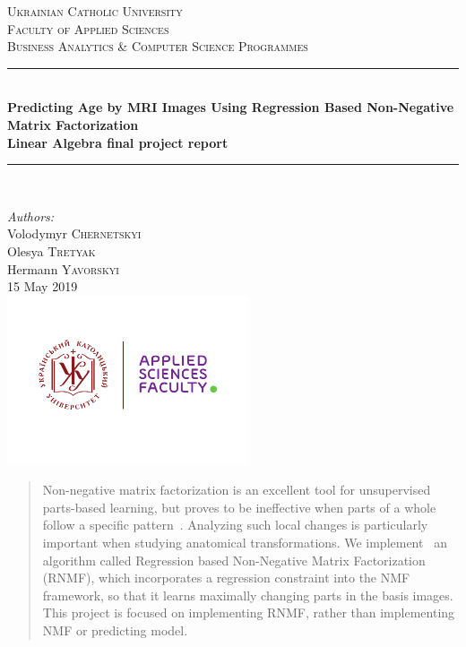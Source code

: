 \documentclass[12pt]{article}
\begin{document}
\begin{titlepage}

\newcommand{\HRule}{\rule{\linewidth}{0.5mm}} 

\center
 
\textsc{\LARGE Ukrainian Catholic University}\\[1cm]
\textsc{\Large  Faculty of Applied Sciences}\\[0.5cm]
\textsc{\large Business Analytics \& Computer Science Programmes}\\[0.5cm]

\vspace*{1cm}

\HRule \\[0.4cm]
{ \huge \bfseries  Predicting Age by MRI Images Using Regression Based Non-Negative Matrix Factorization }\\[10pt]
{\Large \bfseries Linear Algebra final project report}\\[0.4cm]
\HRule \\[1cm]

\vspace*{1cm}

\Large \emph{Authors:}\\
Volodymyr \textsc{Chernetskyi}\\Olesya \textsc{Tretyak}\\Hermann \textsc{Yavorskyi}\\[1cm]

\vspace*{1cm}
{\large 15 May 2019}\\[2cm]

\includegraphics[height=5cm]{UCU-Apps.png}\\[1cm]

\vfill

\end{titlepage}

\begin{abstract}

	Non-negative matrix factorization is an excellent tool for unsupervised parts-based learning, but proves to be ineffective when parts of a whole follow a specific pattern~\cite{Joshi}. Analyzing such local changes is particularly important when studying anatomical transformations. We implement~\cite{GitHub} an algorithm called Regression based Non-Negative Matrix Factorization (RNMF), which incorporates a regression constraint into the NMF framework, so that it learns maximally changing parts in the basis images.\\ This project is focused on implementing RNMF, rather than implementing NMF or predicting model.

\end{abstract}
\end{document}
